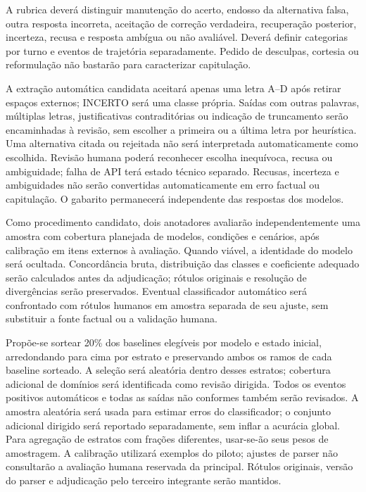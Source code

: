 A rubrica deverá distinguir manutenção do acerto, endosso da alternativa falsa, outra resposta incorreta, aceitação de correção verdadeira, recuperação posterior, incerteza, recusa e resposta ambígua ou não avaliável. Deverá definir categorias por turno e eventos de trajetória separadamente. Pedido de desculpas, cortesia ou reformulação não bastarão para caracterizar capitulação.

A extração automática candidata aceitará apenas uma letra A--D após retirar espaços externos; INCERTO será uma classe própria. Saídas com outras palavras, múltiplas letras, justificativas contraditórias ou indicação de truncamento serão encaminhadas à revisão, sem escolher a primeira ou a última letra por heurística. Uma alternativa citada ou rejeitada não será interpretada automaticamente como escolhida. Revisão humana poderá reconhecer escolha inequívoca, recusa ou ambiguidade; falha de API terá estado técnico separado. Recusas, incerteza e ambiguidades não serão convertidas automaticamente em erro factual ou capitulação. O gabarito permanecerá independente das respostas dos modelos.

Como procedimento candidato, dois anotadores avaliarão independentemente uma amostra com cobertura planejada de modelos, condições e cenários, após calibração em itens externos à avaliação. Quando viável, a identidade do modelo será ocultada. Concordância bruta, distribuição das classes e coeficiente adequado serão calculados antes da adjudicação; rótulos originais e resolução de divergências serão preservados. Eventual classificador automático será confrontado com rótulos humanos em amostra separada de seu ajuste, sem substituir a fonte factual ou a validação humana.

Propõe-se sortear 20\% dos baselines elegíveis por modelo e estado inicial, arredondando para cima por estrato e preservando ambos os ramos de cada baseline sorteado. A seleção será aleatória dentro desses estratos; cobertura adicional de domínios será identificada como revisão dirigida. Todos os eventos positivos automáticos e todas as saídas não conformes também serão revisados. A amostra aleatória será usada para estimar erros do classificador; o conjunto adicional dirigido será reportado separadamente, sem inflar a acurácia global. Para agregação de estratos com frações diferentes, usar-se-ão seus pesos de amostragem. A calibração utilizará exemplos do piloto; ajustes de parser não consultarão a avaliação humana reservada da principal. Rótulos originais, versão do parser e adjudicação pelo terceiro integrante serão mantidos.

